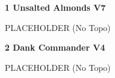 \begin{multicols}{2}
					\label{rt:Unsalted Almonds} \colorbox{Goldenrod!50}{\textbf{1 Unsalted Almonds V7  }}
					\begin{adjustwidth}{1cm}{}
					PLACEHOLDER
						\newline (No Topo) 
					\end{adjustwidth}
					\label{rt:Dank Commander} \colorbox{RoyalBlue!20}{\textbf{2 Dank Commander V4  }}
					\begin{adjustwidth}{1cm}{}
					PLACEHOLDER
						\newline (No Topo) 
					\end{adjustwidth}
\end{multicols}
\clearpage
